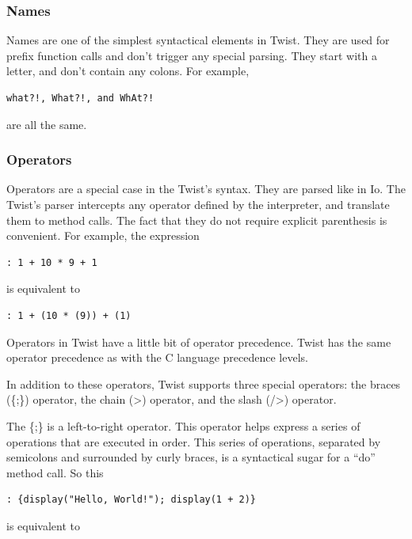 \subsubsection{Names}
\label{sec:names}

Names are one of the simplest syntactical elements in Twist. They are used for prefix function calls and don't trigger any special parsing. They start with a letter, and don't contain any colons. For example, 

\begin{verbatim}
what?!, What?!, and WhAt?! 
\end{verbatim} 

are all the same.

\subsubsection{Operators}
\label{sec:operators}

Operators are a special case in the Twist's syntax. They are parsed like in Io. The Twist's parser intercepts any operator defined by the interpreter, and translate them to method calls. The fact that they do not require explicit parenthesis is convenient. For example, the expression

\begin{verbatim}
: 1 + 10 * 9 + 1
\end{verbatim}

is equivalent to

\begin{verbatim}
: 1 + (10 * (9)) + (1)
\end{verbatim}

Operators in Twist have a little  bit of operator precedence. Twist has the same operator precedence as with the C language precedence levels.

In addition to these operators, Twist supports three special operators: the braces (\{;\}) operator, the chain (>) operator, and the slash (/>) operator.

The \{;\} is a left-to-right operator. This operator helps express a series of operations that are executed in order. This series of operations, separated by semicolons and surrounded by curly braces, is a syntactical sugar for a ``do'' method call. So this

\begin{verbatim}
: {display("Hello, World!"); display(1 + 2)}
\end{verbatim}

is equivalent to

